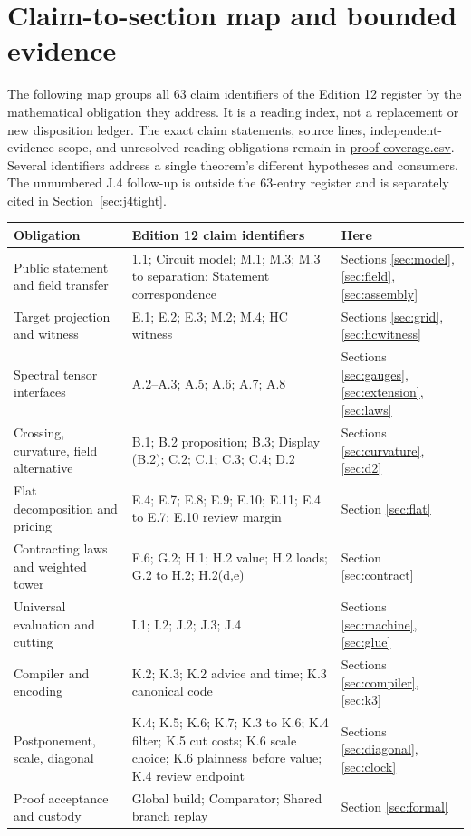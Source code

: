 \documentclass[11pt,letterpaper]{article}
\theoremstyle{definition}\newtheorem{definition}[theorem]{Definition}\newtheorem{example}[theorem]{Example}
\theoremstyle{remark}\newtheorem{remark}[theorem]{Remark}
\newcommand{\aud}[2]{\href{https://github.com/nousentllc/VP-VNP-Review/blob/567303d0bcf4f9d54390437b137752446e58ccd6/#1}{#2}}
\begin{document}
\section{Claim-to-section map and bounded evidence}\label{app:matrix}
The following map groups all 63 claim identifiers of the Edition 12 register by the mathematical obligation they address. It is a reading index, not a replacement or new disposition ledger. The exact claim statements, source lines, independent-evidence scope, and unresolved reading obligations remain in \aud{report/proof-coverage.csv}{proof-coverage.csv}. Several identifiers address a single theorem's different hypotheses and consumers. The unnumbered J.4 follow-up is outside the 63-entry register and is separately cited in Section~\ref{sec:j4tight}.
\small
\begin{longtable}{@{}p{.23\linewidth}p{.46\linewidth}p{.23\linewidth}@{}}
\toprule
Obligation & Edition 12 claim identifiers & Here \\\midrule\endhead
Public statement and field transfer & 1.1; Circuit model; M.1; M.3; M.3 to separation; Statement correspondence & Sections \ref{sec:model}, \ref{sec:field}, \ref{sec:assembly}\\[3pt]
Target projection and witness & E.1; E.2; E.3; M.2; M.4; HC witness & Sections \ref{sec:grid}, \ref{sec:hcwitness}\\[3pt]
Spectral tensor interfaces & A.2--A.3; A.5; A.6; A.7; A.8 & Sections \ref{sec:gauges}, \ref{sec:extension}, \ref{sec:laws}\\[3pt]
Crossing, curvature, field alternative & B.1; B.2 proposition; B.3; Display (B.2); C.2; C.1; C.3; C.4; D.2 & Sections \ref{sec:curvature}, \ref{sec:d2}\\[3pt]
Flat decomposition and pricing & E.4; E.7; E.8; E.9; E.10; E.11; E.4 to E.7; E.10 review margin & Section \ref{sec:flat}\\[3pt]
Contracting laws and weighted tower & F.6; G.2; H.1; H.2 value; H.2 loads; G.2 to H.2; H.2(d,e) & Section \ref{sec:contract}\\[3pt]
Universal evaluation and cutting & I.1; I.2; J.2; J.3; J.4 & Sections \ref{sec:machine}, \ref{sec:glue}\\[3pt]
Compiler and encoding & K.2; K.3; K.2 advice and time; K.3 canonical code & Sections \ref{sec:compiler}, \ref{sec:k3}\\[3pt]
Postponement, scale, diagonal & K.4; K.5; K.6; K.7; K.3 to K.6; K.4 filter; K.5 cut costs; K.6 scale choice; K.6 plainness before value; K.4 review endpoint & Sections \ref{sec:diagonal}, \ref{sec:clock}\\[3pt]
Proof acceptance and custody & Global build; Comparator; Shared branch replay & Section \ref{sec:formal}\\
\bottomrule
\end{longtable}
\normalsize
\end{document}

